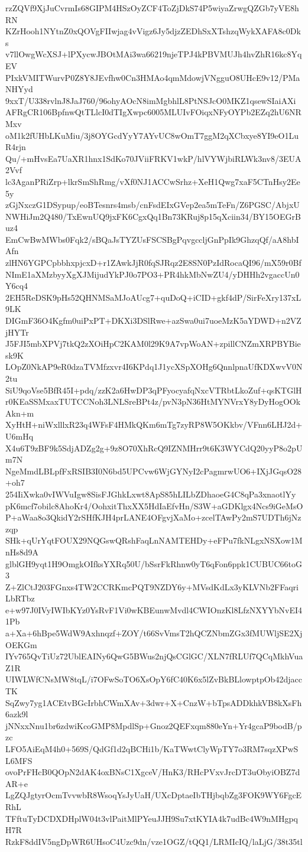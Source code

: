 rzZQVf9XjJuCvrmIs68GIPM4HSzOyZCF4ToZjDkS74P5wiyaZrwgQZGb7yVE8hRN
KZrHooh1NYtnZ0xQOVgFIIwjag4vVigz6Jy5djzZEDhSxXTshzqWykXAFA8c0Dks
v7llOwgWcXSJ+lPXycwJBOtMAi3wa66219njeTPJ4kPBVMUJh4hvZhR16kc8YqEV
PIxkVMITWurvP0Z8Y8JEvfhw0Cn3HMAo4qmMdowjVNgguO8UHcE9v12/PMaNHYyd
9xxT/U338rvlnJ8JaJ760/96ohyAOcN8imMgbhlL8PtNSJcO0MKZ1qsewSIaiAXi
AFRgCR106BpfnwQtTLlcI0dTIgXwpc6005MLUIvFOiqxNFyOYPb2EZq2hU6NRMxv
oM1k2fUHbLKuMiu/3j8OYGcdYyY7AYvUC8wOmT7ggM2qXCbxye8YI9eO1LuR4rjn
Qu/+mHvsEa7UaXR1hnx1SdKo70JViiFRKV1wkP/hlVYWjbiRLWk3nv8/3EUA2Vvf
lc3AganPRiZrp+lkrSmShRmg/vXf0NJ1ACCwSrhz+XeH1Qwg7xaF5CTnHsy2Ee5y
zGjNxczG1DSypup/eoBTesnrs4msb/cnFsdEIxGVep2ea5mTeFn/Z6PGSC/AbjxU
NWHiJm2Q480/TxEwnUQ9jxFK6CgxQq1Bn73KRuj8p15qXciin34/BY15OEGrBuz4
EmCwBwMWbs0Fqk2/sBQaJsTYZUsFSCSBgPqvgccljGnPpIk9GhzqQf/aA8hbIAfn
zlHN6YGPCpbbhxpjcxD+r1ZAwkJjR0fqSJRqz2E8SN0PzIdRocaQI96/mX59r0Bf
NImE1aXMzbyyXgXJMijudYkPJ0o7PO3+PR4hkMbNwZU4/yDHHh2vgaccUn0Y6cq4
2EH5ReDSK9pHs52QHNMSaMJoAUcg7+quDoQ+iCID+gkf4dP/SirFeXry137xL9LK
DIGmF36O4Kgfm0uiPxPT+DKXi3DSlRwe+azSwa0ui7uoeMzK5aYDWD+n2VZjHYTr
J5FJI5mbXPVj7tkQ2zXOiHpC2KAM0l29K9A7vpWoAN+zpillCNZmXRPBYBiesk9K
LOpZ0NkAP9eR0dzaTVMfzxvr4I6KPdq1J1ycXSpXOHg6QnnlpnaUfKDXwvV0N2tu
SiU9qoVse5BfR45I+pdq/zzK2a6HwDP3qPFyocyafqNxcVTRbtLkoZuf+qsKTGlH
r0KEaSSMxaxTUTCCNoh3LNLSreBPt4z/pvN3pN36HtMYNVrxY8yDyHogOOkAkn+m
XyHtH+niWxlllxR23q4WFsF4HMkQKm6mTg7zyRP8W5OKkbv/VFnn6LHJ2d+U6mHq
X4u6T9zBF9k5SdjADZg2g+9z8O70XhRcQ9IZNMHrr9t6K3WYCdQ20yyP8o2pUm7N
NgeMmdLBLpfFxRSIB3I0N6bd5UPCvw6WjGYNyI2cPagmrwUO6+IXjJGqsO28+oh7
254IiXwka0vIWVuIgw8SisFJGhkLxwt8ApS85hLILbZDhaoeG4C8qPa3xnaotlYy
pK6mcf7obilc8AhoKr4/OohxitThxXX5HdIaEfvHn/S3W+aGDKlgx4Ncs9iGeMsO
P+aWaa8o3QkidY2rSHfKJH4prLANE4OFgvjXaMo+zcelTAwPy2mS7UDTh6jNzzqp
SHk+qUrYqtFOUX29NQGswQRshFaqLnNAMTEHDy+eFPu7fkNLgxNSXow1MnHs8d9A
glblGH9yqt1H9OmgkOIfksYXRq50U/bSsrFkRhnw0yT6qFon6ppk1CUBUC66toG3
Z+ZlCtJ203FGnxs4TW2CCRKmcPQT9NZDY6y+MVsdKdLx3yKLVNb2FFaqriLbRTbz
e+w97J0IVyIWIbKYz0YsRvF1Vi0wKBEunwMvdl4CWIOnzKl8LfzNXYYbNvEI41Pb
a+Xa+6hBpe5WdW9Axhnqzf+ZOY/t66SvVmsT2hQCZNbmZGx3fMUWljSE2XjOEKGm
IYv765QvTiUz72UblEAINy6QwG5BWus2njQsCGlGC/XLN7fRLUf7QCqMkhVuaZ1R
UIWLWfCNsMW8tqL/i7OFwSoTO6XsOpY6fC40K6x5lZvBkBLlowptpOb42djaccTK
SqZwy7yg1ACEtvBGcIrbhCWmXAv+3dwr+X+CnzW+bTpsADDkhkVB8kXsFh6azk9l
jNNxxNnu1br6zdwiKcoGMP8MpdlSp+Gnoz2QEFxqm880eYn+Yr4gcaP9bodB/pzc
LFO5AiEqM4h0+569S/QdGf1d2qBCHi1b/KaTWwtClyWpTY7o3RM7sqzXPwSL6MFS
ovoPrFHcB0QOpN2dAK4oxBNsC1XgceV/HnK3/RHcPVxvJrcDT3uObyiOBZ7dAR+e
LgZQJgtyrOcmTvvwbR8WsoqYsJyUaH/UXcDptaeIbTHjbqbZg3FOK9WY6FgcERhL
TFftuTyDCDXDHplW04t3vlPaitMlPYeuJJH9Su7xtKYIA4k7udBc4W9nMHgpqH7R
RzkF8ddIV5ngDpWR6UHsoC4Uzc9dn/vze1OGZ/tQQ1/LRMIcIQ/laLjG/38t35tl
